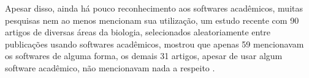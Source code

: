 %


Apesar disso, ainda há pouco reconhecimento aos softwares acadêmicos, muitas
pesquisas nem ao menos mencionam sua utilização, um estudo recente com 90
artigos de diversas áreas da biologia, selecionados aleatoriamente entre
publicações usando softwares acadêmicos, mostrou que apenas 59 mencionavam os
softwares de alguma forma, os demais 31 artigos, apesar de usar algum software
acadêmico, não mencionavam nada a respeito \cite{howison2016software}.

